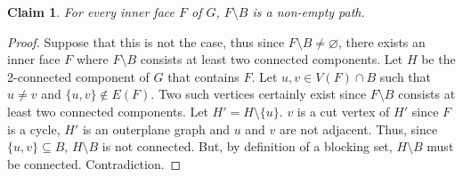 \documentclass{patmorin}
\let\emptyset\varnothing
\newtheorem{claim}{Claim}[theorem]
\begin{document}
 \begin{claim}
  For every inner face $F$ of $G$, $F \setminus B$ is a non-empty path.
  \label{claim:facesMinusBarePaths}
 \end{claim}
 
 \begin{proof}
 Suppose that this is not the case, thus since $F \setminus B \not= \emptyset$, there exists an inner face $F$ where $F \setminus B$ consists at least two connected components. Let $H$ be the 2-connected component of $G$ that contains $F$. Let $u,v \in V(F) \cap B$ such that $u \not= v$ and $\{u,v\} \notin E(F)$. Two such vertices certainly exist since $F \setminus B$ consists at least two connected components. Let $H'=H \setminus \{u\}$. $v$ is a cut vertex of $H'$ since $F$ is a cycle, $H'$ is an outerplane graph and $u$ and $v$ are not adjacent. Thus, since $\{u,v\} \subseteq B$, $H \setminus B$ is not connected. But, by definition of a blocking set, $H \setminus B$ must be connected. Contradiction. 
 \end{proof} 
\end{document}
